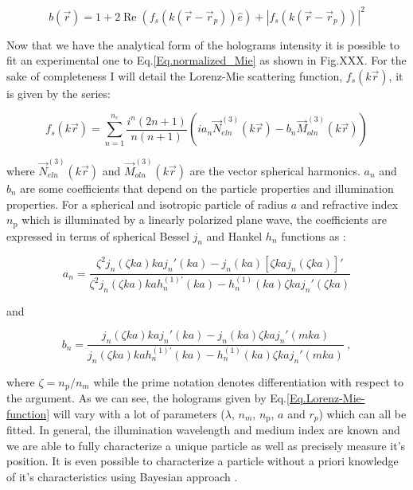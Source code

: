 \begin{equation}
	b(\vec{r}) = 1 + 2 \operatorname{Re} 
	\left(  
		f_s(k(\vec{r}- \vec{r}_p)) \hat{e}
	\right)
	+
	|
		f_s(k(\vec{r}- \vec{r}_p))
	|^2
	\label{Eq.normalized_Mie}	
\end{equation}


Now that we have the analytical form of the holograms intensity it is possible to fit an experimental one to Eq.\ref{Eq.normalized_Mie} as shown in Fig.XXX. For the sake of completeness I will detail the Lorenz-Mie scattering function, $f_s(k\vec{r})$, it is given by the series:

\begin{equation}
	f_s(k \vec{r}) = \sum _{n=1} ^{n_c} 
	\frac
	{
		i^n (2n +1)
	}
	{
		n(n+1)
	}
	\left(
		i a_n \vec{N}^{(3)}_{eln}(k\vec{r})
		-
		b_n \vec{M}^{(3)}_{oln}(k\vec{r})
	\right)
	\label{Eq.Lorenz-Mie-function}
\end{equation} 


where $\vec{N}^{(3)}_{eln}(k\vec{r})$ and $\vec{M}^{(3)}_{oln}(k\vec{r})$ are the vector spherical harmonics. $a_n$ and $b_n$ are some coefficients that depend on the particle properties and illumination properties. For a spherical and isotropic particle of radius $a$ and refractive index $n_\mathrm{p}$ which is illuminated by a linearly polarized plane wave, the coefficients are expressed in terms of spherical Bessel $j_n$ and Hankel $h_n$ functions as \cite{f_bohren_absorption_1998}:

\begin{equation}
	a_n = 
	\frac
	{
		\zeta^2 j_n (\zeta k a)k a j_n' (k a) - j_n(ka)[\zeta kaj_n(\zeta ka)]'
	}
	{
		\zeta^2 j_n (\zeta k a)k a h_n^{(1)'} (k a) - h_n^{(1)}(ka)\zeta kaj_n'(\zeta ka)
	}
\end{equation}

and

\begin{equation}
	b_n =
	\frac
	{
		j_n(\zeta k a) kaj_n'(ka) - j_n (ka) \zeta kaj_n'(mka)
	}
	{
		j_n(\zeta k a) kah_n^{(1)'}(ka) - h_n^{(1)} (ka) \zeta kaj_n '(mka)
	} ~,
\end{equation}


where $\zeta = n_\mathrm{p} / n_m$ while the prime notation denotes differentiation with respect to the argument. As we can see, the holograms given by Eq.\ref{Eq.Lorenz-Mie-function} will vary with a lot of parameters ($\lambda$, $n_m$, $n_\mathrm{p}$, $a$ and $r_p$) which can all be fitted. In general, the illumination wavelength and medium index are known and we are able to fully characterize a unique particle as well as precisely measure it's position. It is even possible to characterize a particle without a priori knowledge of it's characteristics using Bayesian approach \cite{gregory_bayesian_2005, dimiduk_bayesian_2016}.

